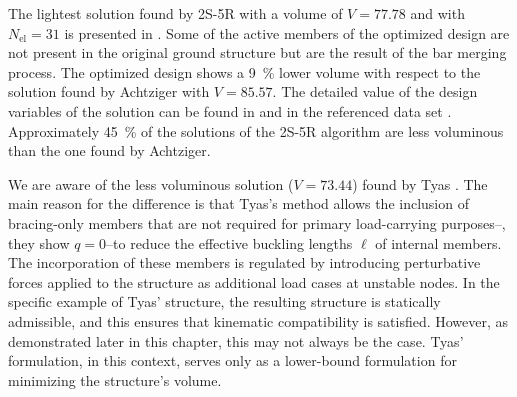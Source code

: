 The lightest solution found by 2S-5R with a volume of $V=77.78$ and with $N_{\text{el}}=31$ is presented in . Some of the active members of the optimized design are not present in the original ground structure but are the result of the bar merging process. The optimized design shows a \qty{9}{\%} lower volume with respect to the solution found by Achtziger  with $V=85.57$. The detailed value of the design variables of the solution can be found in  and in the referenced data set . Approximately \qty{45}{\%} of the solutions of the 2S-5R algorithm are less voluminous than the one found by Achtziger.

We are aware of the less voluminous solution ($V=73.44$) found by Tyas \etal {}. The main reason for the difference is that Tyas's method allows the inclusion of bracing-only members that are not required for primary load-carrying purposes--\ie, they show $q=0$--to reduce the effective buckling lengths $\ell$ of internal members. The incorporation of these members is regulated by introducing perturbative forces applied to the structure as additional load cases at unstable nodes. In the specific example of Tyas' structure, the resulting structure is statically admissible, and this ensures that kinematic compatibility is satisfied. However, as demonstrated later in this chapter, this may not always be the case. Tyas' formulation, in this context, serves only as a lower-bound formulation for minimizing the structure's volume.

